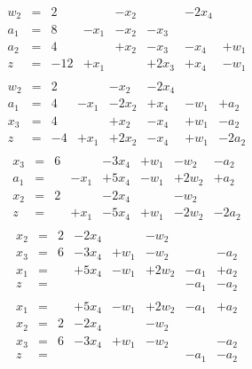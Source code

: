 \documentclass[a4paper,oneside,11pt]{amsart}
\begin{document}
\[
\begin{array}{rcllllll}
w_2 & =  &2 &  &-x_2 &  &-2x_4 & \\
a_1 & =  &8 &-x_1 &-x_2 &-x_3 &  & \\
a_2 & =  &4 &  &+x_2 &-x_3 &-x_4 &+w_1\\\hline
z &= &-12 &+x_1 &  &+2x_3 &+x_4 &-w_1\\
\end{array}
\]
\vspace{1cm}
\[
\begin{array}{rcllllll}
w_2 & =  &2 &  &-x_2 &-2x_4 &  & \\
a_1 & =  &4 &-x_1 &-2x_2 &+x_4 &-w_1 &+a_2\\
x_3 & =  &4 &  &+x_2 &-x_4 &+w_1 &-a_2\\\hline
z &= &-4 &+x_1 &+2x_2 &-x_4 &+w_1 &-2a_2\\
\end{array}
\]
\vspace{1cm}
\[
\begin{array}{rcllllll}
x_3 & =  &6 &  &-3x_4 &+w_1 &-w_2 &-a_2\\
a_1 & =  &  &-x_1 &+5x_4 &-w_1 &+2w_2 &+a_2\\
x_2 & =  &2 &  &-2x_4 &  &-w_2 & \\\hline
z &= &  &+x_1 &-5x_4 &+w_1 &-2w_2 &-2a_2\\
\end{array}
\]
\vspace{1cm}
\[
\begin{array}{rcllllll}
x_2 & =  &2 &-2x_4 &  &-w_2 &  & \\
x_3 & =  &6 &-3x_4 &+w_1 &-w_2 &  &-a_2\\
x_1 & =  &  &+5x_4 &-w_1 &+2w_2 &-a_1 &+a_2\\\hline
z &= &  &  &  &  &-a_1 &-a_2\\
\end{array}
\]
\vspace{1cm}
\[
\begin{array}{rcllllll}
x_1 & =  &  &+5x_4 &-w_1 &+2w_2 &-a_1 &+a_2\\
x_2 & =  &2 &-2x_4 &  &-w_2 &  & \\
x_3 & =  &6 &-3x_4 &+w_1 &-w_2 &  &-a_2\\\hline
z &= &  &  &  &  &-a_1 &-a_2\\
\end{array}
\]
\vspace{1cm}
\end{document}
